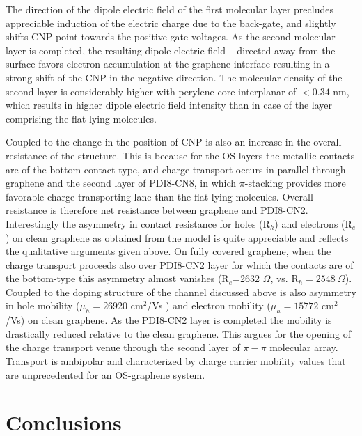\documentclass[preprint,aip,jap]{revtex4-2}
\begin{document}
  The direction of the dipole electric field of the first molecular layer precludes appreciable induction of the electric charge due to the back-gate, and slightly shifts CNP point towards the positive gate voltages.
 As the second molecular layer is completed, the resulting dipole electric field -- directed away from the surface favors electron accumulation at the graphene interface resulting in a strong shift of the CNP in the negative direction.
  The molecular density of the second layer is considerably higher with perylene core interplanar of $< 0.34$ nm, which results in higher dipole electric field intensity than in  case of the layer comprising the flat-lying molecules.


Coupled to the change in the position of CNP is also an increase in the overall resistance of the structure.
 This is because for the OS layers the metallic contacts are of the  bottom-contact type, and charge transport occurs in parallel through graphene and the second layer of PDI8-CN8, in which $\pi$-stacking provides more favorable charge transporting lane than the flat-lying molecules.
 Overall resistance is therefore net resistance between graphene and PDI8-CN2.
 Interestingly the asymmetry in contact resistance for holes (R$_{h}$) and  electrons  (R$_{e}$) on clean graphene as obtained from the model is quite appreciable and reflects the qualitative arguments given above.
  On fully covered graphene, when the charge transport proceeds also over PDI8-CN2 layer for which the contacts are of the bottom-type this asymmetry almost vanishes (R$_{e}$=2632 $\Omega$, vs. R$_{h}=2548\ \Omega$).
  Coupled to the doping structure of the channel discussed above is also asymmetry in hole mobility  ($\mu_{h}= 26920$ cm$^{2}$/Vs ) and electron mobility ($\mu_{h}= 15772$ cm$^{2}$/Vs) on clean graphene.
 As the PDI8-CN2 layer is completed the mobility is drastically reduced relative to the clean graphene.
  This argues for the opening of the charge transport venue through the second layer of $\pi-\pi$ molecular array.
 Transport is ambipolar and characterized by charge carrier mobility values that are unprecedented for an OS-graphene system.
  

\section{Conclusions}
\label{sec:conc}
\end{document}
